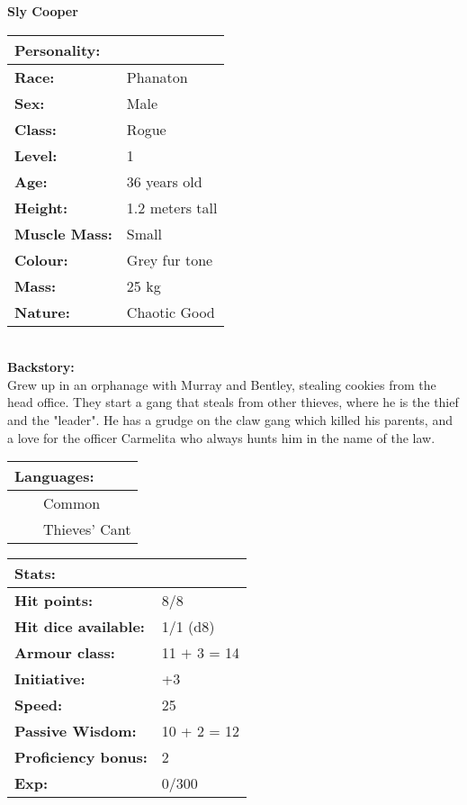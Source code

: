 \documentclass[11pt]{article}
\newcommand{\tabitem}{~~\llap{--}~~}
\begin{document}
	\begin{center}
\Huge \textbf{Sly Cooper}
	\end{center}
	\begin{multicols}{2}
\noindent \begin{tabularx}{95mm}{@{}l l}
\Large \textbf{Personality:} 	& 						\\
\hline
\textbf{Race:} 					& Phanaton		 		\\
\textbf{Sex:} 					& Male 					\\
\textbf{Class:}					& Rogue					\\
\textbf{Level:} 				& 1						\\
\textbf{Age:} 					& 36 years old			\\
\textbf{Height:} 				& 1.2 meters tall 		\\
\textbf{Muscle Mass:} 			& Small 				\\
\textbf{Colour:} 				& Grey fur tone		 	\\
\textbf{Mass:} 					& 25 kg		 			\\
\textbf{Nature:} 				& Chaotic Good
		\end{tabularx} \\
\textbf{Backstory:} \\
Grew up in an orphanage with Murray and Bentley, stealing cookies from the head office. They start a gang that steals from other thieves, where he is the thief and the "leader". He has a grudge on the claw gang which killed his parents, and a love for the officer Carmelita who always hunts him in the name of the law.

\noindent \begin{tabularx}{95mm}{@{}l}
{\Large \textbf{Languages:}} \\
\hline
\tabitem Common \\
\tabitem Thieves' Cant
		\end{tabularx}

\vspace{4mm}

\noindent \begin{tabularx}{95mm}{@{}l l}
\Large \textbf{Stats:}		 	& 									\\
\hline
\textbf{Hit points:} 			& 8/8					 			\\
\textbf{Hit dice available:}	& 1/1 (d8)							\\
\textbf{Armour class:} 			& 11 $+$ 3 = 14					 	\\
\textbf{Initiative:} 			& +3								\\
\textbf{Speed:} 				& 25	 							\\
\textbf{Passive Wisdom:} 		& 10 + 2 = 12	 					\\
\textbf{Proficiency bonus:}		& 2									\\
\textbf{Exp:} 					& 0/300
		\end{tabularx}


\end{multicols}
\end{document}
